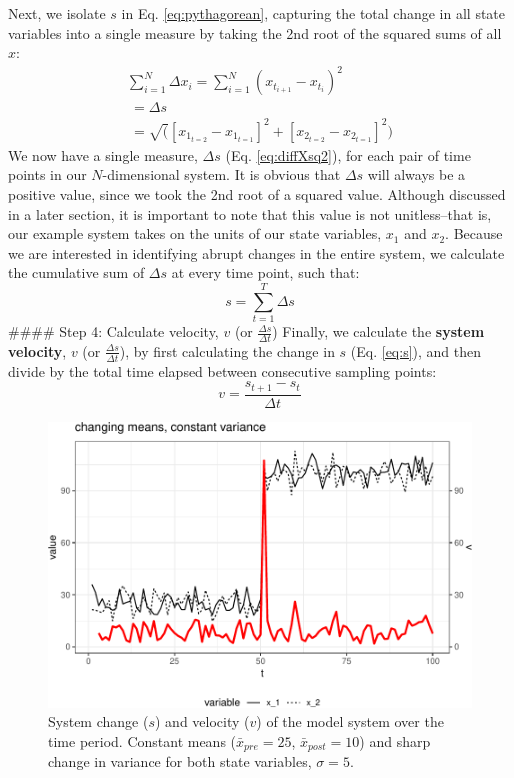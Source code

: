 \documentclass[12pt,twoside,openany]{reedthesis}
\begin{document}
Next, we isolate \(s\) in Eq. \eqref{eq:pythagorean}, capturing the total change in all state variables into a single measure by taking the 2nd root of the squared sums of all \(x\):
\begin{equation}
\begin{array}{rcr}
\sum_{i=1}^{N} \Delta {x_i} = \sum_{i=1}^{N}(x_{t_{i+1}} - x_{t_i})^2 \\ 
\ = \Delta s \\ 
\ = \sqrt([x_{1_{t=2}} - x_{1_{t=1}}]^2 + [x_{2_{t=2}} - x_{2_{t=1}}]^2)
\end{array}
\label{eq:diffXsq2}
\end{equation}
We now have a single measure, \(\Delta s\) (Eq. \eqref{eq:diffXsq2}), for each pair of time points in our \(N\)-dimensional system. It is obvious that \(\Delta s\) will always be a positive value, since we took the 2nd root of a squared value. Although discussed in a later section, it is important to note that this value is not unitless--that is, our example system takes on the units of our state variables, \(x_1\) and \(x_2\). Because we are interested in identifying abrupt changes in the entire system, we calculate the cumulative sum of \(\Delta s\) at every time point, such that:
\begin{equation}
s = \sum_{t=1}^T \Delta s
\label{eq:s}
\end{equation}
\#\#\#\# Step 4: Calculate velocity, \(v\) (or \(\frac {\Delta s}{\Delta t}\))
Finally, we calculate the \textbf{system velocity}, \(v\) (or \(\frac{\Delta s}{\Delta t}\)), by first calculating the change in \(s\) (Eq. \eqref{eq:s}), and then divide by the total time elapsed between consecutive sampling points:
\begin{equation}
 v = \frac {s_{t+1}-s_{t}}{\Delta t} 
\label{eq:velocity}
\end{equation}
\begin{figure}[h]

{\centering \includegraphics[width=0.95\linewidth]{_myDissertation_files/figure-latex/velocSysEx1-1} 

}

\caption{System change ($s$) and velocity ($v$) of the model system over the time period. Constant means ($\bar{x}_{pre}=25$, $\bar{x}_{post}=10$) and sharp change in variance for both state variables, $\sigma =5$.}\label{fig:velocSysEx1}
\end{figure}
\end{document}
